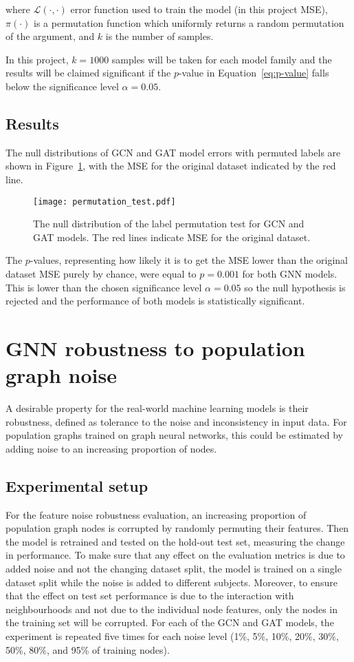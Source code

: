 where $\mathcal{L}(\cdot, \cdot)$ error function used to train the model (in this project MSE), $\pi(\cdot)$ is a permutation function which uniformly returns a random permutation of the argument, and $k$ is the number of samples.

In this project, $k=1000$ samples will be taken for each model family and the results will be claimed significant if the $p$-value in Equation~\eqref{eq:p-value} falls below the significance level $\alpha=0.05$. 

\subsection{Results}
The null distributions of GCN and GAT model errors with permuted labels are shown in Figure~\ref{figure:permutation-test}, with the MSE for the original dataset indicated by the red line.

\begin{figure}[h]
    \centering
    \texttt{[image: permutation\_test.pdf]}
    \caption{The null distribution of the label permutation test for GCN and GAT models. The red lines indicate MSE for the original dataset.}\label{figure:permutation-test}
\end{figure}

The $p$-values, representing how likely it is to get the MSE lower than the original dataset MSE purely by chance, were equal to $p=0.001$ for both GNN models. This is lower than the chosen significance level $\alpha=0.05$ so the null hypothesis is rejected and the performance of both models is statistically significant.


\section{GNN robustness to population graph noise}
\label{section:node-noise}
A desirable property for the real-world machine learning models is their robustness, defined as tolerance to the noise and inconsistency in input data.
For population graphs trained on graph neural networks, this could be estimated by adding noise to an increasing proportion of nodes. 

\subsection{Experimental setup}
For the feature noise robustness evaluation, an increasing proportion of population graph nodes is corrupted by randomly permuting their features. Then the model is retrained and tested on the hold-out test set, measuring the change in performance. To make sure that any effect on the evaluation metrics is due to added noise and not the changing dataset split, the model is trained on a single dataset split while the noise is added to different subjects. Moreover, to ensure that the effect on test set performance is due to the interaction with neighbourhoods and not due to the individual node features, only the nodes in the training set will be corrupted. For each of the GCN and GAT models, the experiment is repeated five times for each noise level (1\%, 5\%, 10\%, 20\%, 30\%, 50\%, 80\%, and 95\% of training nodes).

